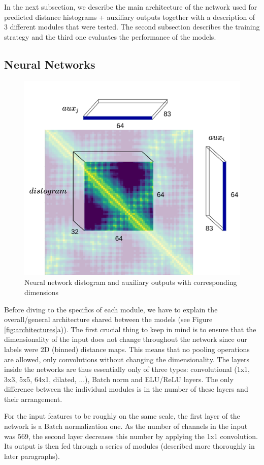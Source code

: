In the next subsection, we describe the main architecture of the network used for predicted distance histograms + auxiliary outputs together with a description of 3 different modules that were tested. 
The second subsection describes the training strategy and the third one evaluates the performance of the models.

\subsection{Neural Networks}

\begin{figure}
    \centering
    \includegraphics[width=0.7\linewidth]{imgs_tomas/outputs.png}
    \caption{Neural network distogram and auxiliary outputs with corresponding dimensions}
    \label{fig:outputs}
\end{figure}

Before diving to the specifics of each module, we have to explain the overall/general architecture shared between the models (see Figure \ref{fig:architectures}a)). 
The first crucial thing to keep in mind is to ensure that the dimensionality of the input does not change throughout the network since our labels were 2D (binned) distance maps. 
This means that no pooling operations are allowed, only convolutions without changing the dimensionality. 
The layers inside the networks are thus essentially only of three types: convolutional (1x1, 3x3, 5x5, 64x1, dilated, ...), Batch norm and ELU/ReLU layers. 
The only difference between the individual modules is in the number of these layers and their arrangement.

For the input features to be roughly on the same scale, the first layer of the network is a Batch normalization one. 
As the number of channels in the input was 569, the second layer decreases this number by applying the 1x1 convolution. 
Its output is then fed through a series of modules (described more thoroughly in later paragraphs).

